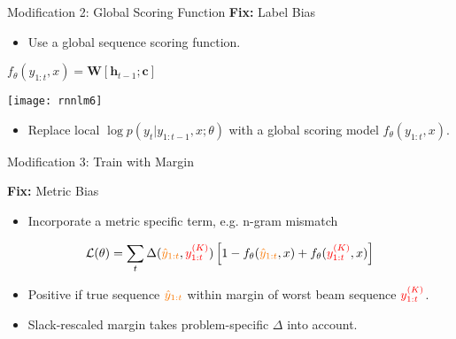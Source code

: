 \begin{frame}{Modification 2: Global Scoring Function  }
  \textbf{Fix:}  Label Bias
    \begin{itemize}
    \item Use a global sequence scoring function.
    \end{itemize}
    \pause


    \air

  \begin{center}
    $f_{\theta}(y_{1:t}, x)= \mathbf{W} [\mathbf{h}_{t-1}; \mathbf{c}]$

    \texttt{[image: rnnlm6]}
  \end{center}


  \begin{itemize}
  \item Replace local $ \log p(y_{t} | y_{1:t-1}, x; \theta)$ with
    a global scoring model $f_{\theta}(y_{1:t}, x)$.
  \end{itemize}
  \air



\end{frame}



\begin{frame}{Modification 3: Train with Margin}

  \textbf{Fix:} Metric Bias
  \begin{itemize}
  \item Incorporate a metric specific term, e.g. n-gram mismatch
  \end{itemize}
  \air
  \pause

  \[ \mathcal{L}(\theta) = \sum_{t} \Delta(\textcolor{gold}{\hat{y}_{1:t}}, \textcolor{red}{y_{1:t}^{(K)}}) \left[1 - f_{\theta}( \textcolor{gold}{\hat{y}_{1:t}}, x) +  f_{\theta}(\textcolor{red}{y_{1:t}^{(K)}}, x) \right] \]

  \begin{itemize}
  \item Positive if true sequence $\textcolor{gold}{\hat{y}_{1:t}}$ within margin of worst beam sequence $\textcolor{red}{y^{(K)}_{1:t}}$.
  \item Slack-rescaled margin takes problem-specific $\Delta$ into account.
  \end{itemize}

\end{frame}


